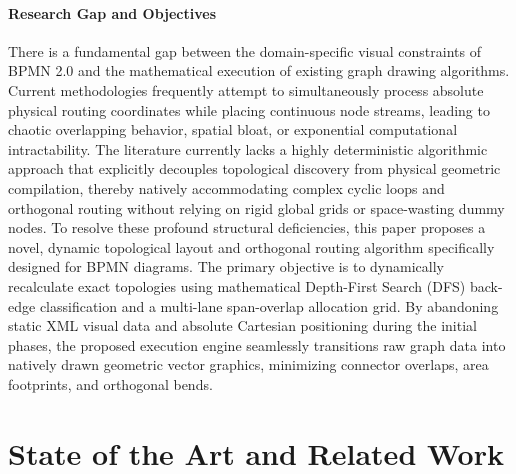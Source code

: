 \documentclass{article}
\begin{document}
	\paragraph{Research Gap and Objectives} 
	There is a fundamental gap between the domain-specific visual constraints of BPMN 2.0 and the mathematical execution of existing graph drawing algorithms. Current methodologies frequently attempt to simultaneously process absolute physical routing coordinates while placing continuous node streams, leading to chaotic overlapping behavior, spatial bloat, or exponential computational intractability. The literature currently lacks a highly deterministic algorithmic approach that explicitly decouples topological discovery from physical geometric compilation, thereby natively accommodating complex cyclic loops and orthogonal routing without relying on rigid global grids or space-wasting dummy nodes. To resolve these profound structural deficiencies, this paper proposes a novel, dynamic topological layout and orthogonal routing algorithm specifically designed for BPMN diagrams. The primary objective is to dynamically recalculate exact topologies using mathematical Depth-First Search (DFS) back-edge classification and a multi-lane span-overlap allocation grid. By abandoning static XML visual data and absolute Cartesian positioning during the initial phases, the proposed execution engine seamlessly transitions raw graph data into natively drawn geometric vector graphics, minimizing connector overlaps, area footprints, and orthogonal bends.
	
	\section{State of the Art and Related Work}
	
\end{document}
